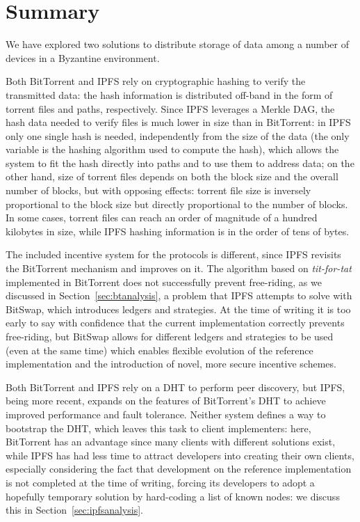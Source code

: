 \documentclass[mscthesis]{usiinfthesis}
\begin{document}
\section{Summary}\label{sec:storagesummary}

We have explored two solutions to distribute storage of data among a number of devices in a Byzantine environment.

Both BitTorrent and IPFS rely on cryptographic hashing to verify the transmitted data: the hash information is distributed off-band in the form of torrent files and paths, respectively. Since IPFS leverages a Merkle DAG, the hash data needed to verify files is much lower in size than in BitTorrent: in IPFS only one single hash is needed, independently from the size of the data (the only variable is the hashing algorithm used to compute the hash), which allows the system to fit the hash directly into paths and to use them to address data; on the other hand, size of torrent files depends on both the block size and the overall number of blocks, but with opposing effects: torrent file size is inversely proportional to the block size but directly proportional to the number of blocks. In some cases, torrent files can reach an order of magnitude of a hundred kilobytes in size, while IPFS hashing information is in the order of tens of bytes.

The included incentive system for the protocols is different, since IPFS revisits the BitTorrent mechanism and improves on it. The algorithm based on \textit{tit-for-tat} implemented in BitTorrent does not successfully prevent free-riding, as we discussed in Section~\ref{sec:btanalysis}, a problem that IPFS attempts to solve with BitSwap, which introduces ledgers and strategies. At the time of writing it is too early to say with confidence that the current implementation correctly prevents free-riding, but BitSwap allows for different ledgers and strategies to be used (even at the same time) which enables flexible evolution of the reference implementation and the introduction of novel, more secure incentive schemes.

Both BitTorrent and IPFS rely on a DHT to perform peer discovery, but IPFS, being more recent, expands on the features of BitTorrent's DHT to achieve improved performance and fault tolerance. Neither system defines a way to bootstrap the DHT, which leaves this task to client implementers: here, BitTorrent has an advantage since many clients with different solutions exist, while IPFS has had less time to attract developers into creating their own clients, especially considering the fact that development on the reference implementation is not completed at the time of writing, forcing its developers to adopt a hopefully temporary solution by hard-coding a list of known nodes: we discuss this in Section~\ref{sec:ipfsanalysis}.
\end{document}
